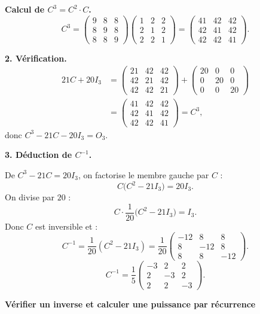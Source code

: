 \textbf{Calcul de $C^3 = C^2 \cdot C$.}
\[
C^3 =
\begin{pmatrix}9&8&8\\8&9&8\\8&8&9\end{pmatrix}
\begin{pmatrix}1&2&2\\2&1&2\\2&2&1\end{pmatrix}
= \begin{pmatrix}41&42&42\\42&41&42\\42&42&41\end{pmatrix}.
\]

\textbf{2. Vérification.}
\[
\begin{aligned}
	21C + 20I_3
	&= \begin{pmatrix}21&42&42\\42&21&42\\42&42&21\end{pmatrix}
	+ \begin{pmatrix}20&0&0\\0&20&0\\0&0&20\end{pmatrix} \\
	&= \begin{pmatrix}41&42&42\\42&41&42\\42&42&41\end{pmatrix}
	= C^3,
\end{aligned}
\]
donc $C^3 - 21C - 20I_3 = O_3$.

\textbf{3. Déduction de $C^{-1}$.}

De $C^3 - 21C = 20I_3$, on factorise le membre gauche par $C$ :
\[
C\bigl(C^2 - 21I_3\bigr) = 20I_3.
\]
On divise par $20$ :
\[
C \cdot \frac{1}{20}\bigl(C^2 - 21I_3\bigr) = I_3.
\]
Donc $C$ est inversible et :
\[
C^{-1} = \frac{1}{20}(C^2 - 21I_3)
= \frac{1}{20}\begin{pmatrix}-12&8&8\\8&-12&8\\8&8&-12\end{pmatrix}.
\]
\[
\boxed{C^{-1} = \frac{1}{5}\begin{pmatrix}-3&2&2\\2&-3&2\\2&2&-3\end{pmatrix}.}
\]

\exerciceresolu
\textbf{Vérifier un inverse et calculer une puissance par récurrence}


